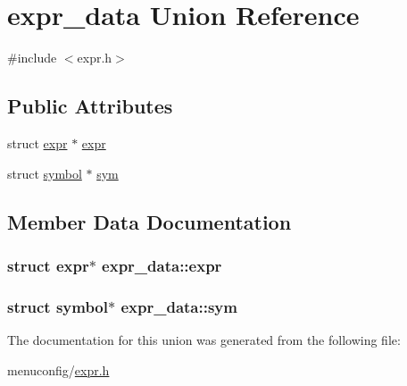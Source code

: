 \hypertarget{unionexpr__data}{\section{expr\-\_\-data Union Reference}
\label{unionexpr__data}
}


{\ttfamily \#include $<$expr.\-h$>$}

\subsection*{Public Attributes}
\begin{DoxyCompactItemize}
\item 
struct \hyperlink{structexpr}{expr} $\ast$ \hyperlink{unionexpr__data_a3acd05b0956b4ca92c9e690cc1dbe141}{expr}
\item 
struct \hyperlink{structsymbol}{symbol} $\ast$ \hyperlink{unionexpr__data_a7507d424e8cc16bfe4ac60082fcee839}{sym}
\end{DoxyCompactItemize}


\subsection{Member Data Documentation}
\hypertarget{unionexpr__data_a3acd05b0956b4ca92c9e690cc1dbe141}{
\subsubsection[{expr}]{\setlength{\rightskip}{0pt plus 5cm}struct {\bf expr}$\ast$ expr\-\_\-data\-::expr}}\label{unionexpr__data_a3acd05b0956b4ca92c9e690cc1dbe141}
\hypertarget{unionexpr__data_a7507d424e8cc16bfe4ac60082fcee839}{
\subsubsection[{sym}]{\setlength{\rightskip}{0pt plus 5cm}struct {\bf symbol}$\ast$ expr\-\_\-data\-::sym}}\label{unionexpr__data_a7507d424e8cc16bfe4ac60082fcee839}


The documentation for this union was generated from the following file\-:\begin{DoxyCompactItemize}
\item 
menuconfig/\hyperlink{expr_8h}{expr.\-h}\end{DoxyCompactItemize}
